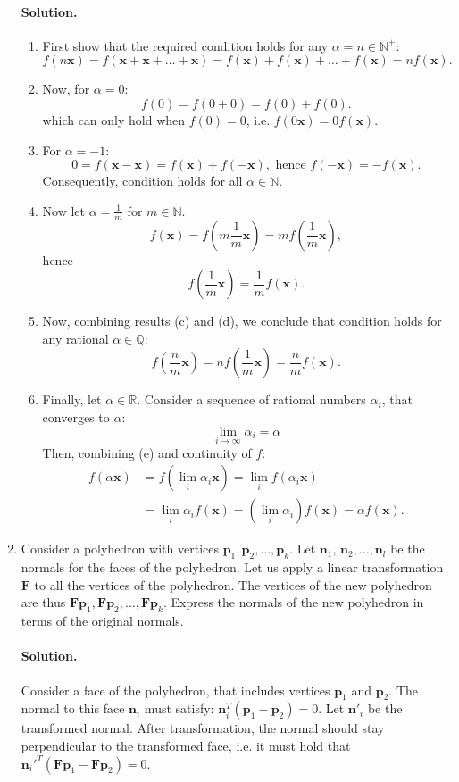 \documentclass{article}
\newcommand{\bbR}{\mathbb{R}}
\newcommand{\bx}{\mathbf{x}}
\newcommand{\bn}{\mathbf{n}}
\newcommand{\bF}{\mathbf{F}}
\newcommand{\bp}{\mathbf{p}}
\begin{document}
\begin{enumerate}
\paragraph{Solution.}
\begin{enumerate}
\item First show that the required condition holds for any $\alpha = n \in \mathbb{N}^+$:
$$
f(n \bx) = f(\bx + \bx + \dots + \bx) = f(\bx) + f(\bx) + \dots + f(\bx) = nf(\bx).
$$
\item Now, for $\alpha = 0$:
$$
f(0) = f(0 + 0) = f(0) + f(0).
$$
which can only hold when $f(0) = 0$, i.e. $f(0\bx) = 0f(\bx)$.
\item For $\alpha = -1$:
$$
0 = f(\bx - \bx) = f(\bx) + f(-\bx), \text{ hence } f(-\bx) = -f(\bx).
$$
Consequently, condition holds for all $\alpha \in \mathbb{N}$.
\item Now let $\alpha = \frac{1}{m}$ for $m\in\mathbb{N}$.
$$
f(\bx) = f(m \frac{1}{m} \bx) = mf(\frac{1}{m}\bx),
$$
hence
$$
f(\frac{1}{m}\bx) = \frac{1}{m}f(\bx).
$$
\item Now, combining results (c) and (d), we conclude that condition holds for any rational $\alpha\in\mathbb{Q}$:
$$
f(\frac{n}{m}\bx) = nf(\frac{1}{m}\bx) = \frac{n}{m}f(\bx).
$$
\item Finally, let $\alpha \in \bbR$. Consider a sequence of rational numbers $\alpha_i$, that converges to $\alpha$:
$$
\lim_{i\to\infty} \alpha_i = \alpha
$$
Then, combining (e) and continuity of $f$:
\begin{align*}
f(\alpha \bx)&= f(\lim_i \alpha_i \bx) = \lim_i f(\alpha_i \bx) \\
             &= \lim_i \alpha_i f(\bx) = (\lim_i \alpha_i) f(\bx) = \alpha f(\bx).
\end{align*}
\end{enumerate}

\item
Consider a polyhedron with vertices $\bp_1, \bp_2, \dots, \bp_k$. Let $\bn_1$, $\bn_2, \dots, \bn_l$ be the normals for the faces of the polyhedron. Let us apply a linear transformation $\bF$ to all the vertices of the polyhedron. The vertices of the new polyhedron are thus $\bF\bp_1, \bF\bp_2, \dots, \bF\bp_k$. Express the normals of the new polyhedron in terms of the original normals.

\paragraph{Solution.}
Consider a face of the polyhedron, that includes vertices $\bp_1$ and $\bp_2$. The normal to this face $\bn_i$ must satisfy: $\bn_i^T(\bp_1-\bp_2) = 0$. Let $\bn'_i$ be the transformed normal. After transformation, the normal should stay perpendicular to the transformed face, i.e. it must hold that $\bn_i'^T(\bF\bp_1 - \bF\bp_2) = 0$.


\end{enumerate}
\end{document}
